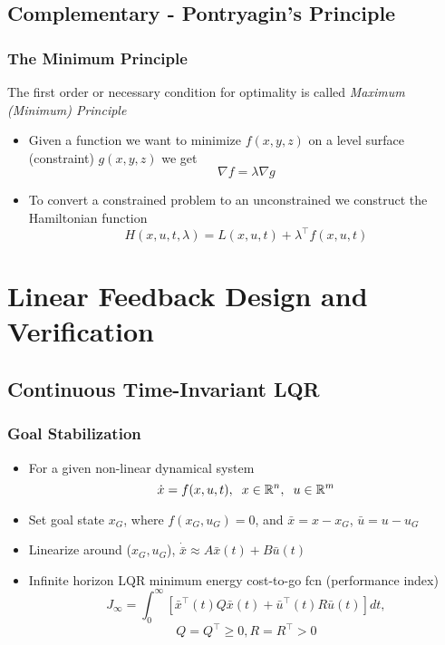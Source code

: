 \documentclass{beamer}
\begin{document}

\subsection{Complementary - Pontryagin's Principle}

\begin{frame}
\frametitle{The Minimum Principle}
The first order or necessary condition for optimality is called \textit{Maximum (Minimum) Principle} 
\begin{itemize}
\item Given a function we want to minimize $f(x,y,z)$ on a level surface (constraint) $g(x,y,z)$ we get
\begin{equation*}
  \nabla f =\lambda \nabla g
\end{equation*} 
\item To convert a constrained problem to an unconstrained we construct the Hamiltonian function 
\begin{equation*}
  H(x,u,t,\lambda )= L(x,u,t)+ \lambda^{\intercal}f(x,u,t)
\end{equation*}   
\end{itemize}
\end{frame}

\section{Linear Feedback Design and Verification}

\subsection{Continuous Time-Invariant LQR}

\begin{frame}
\frametitle{Goal Stabilization}
\begin{itemize}
\item For a given non-linear dynamical system
\begin{equation*}
\dot{x} = f(x,u,t), \hspace{.2cm} x\in \mathbb{R}^n, \hspace{.2cm} u\in \mathbb{R}^m 
\end{equation*} 
\item Set goal state $x_G$, where $f(x_G,u_G)=0$, and $\bar{x}=x-x_G$, $\bar{u}=u-u_G$
\item Linearize around ($x_G, u_G$), $\dot{\bar{x}}\approx A\bar{x}(t)+B\bar{u}(t)$ 
\item Infinite horizon LQR minimum energy cost-to-go fcn (performance index)
\begin{equation*}
J_{\infty}= \int_0^{\infty} [ \bar{x}^{\intercal}(t)Q\bar{x}(t)+\bar{u}^{\intercal}(t)R\bar{u}(t)]dt,
\end{equation*}
\begin{equation*}
Q=Q^{\intercal}\geq 0, R=R^{\intercal}> 0
\end{equation*}
\end{itemize}
\end{frame}
\end{document}
